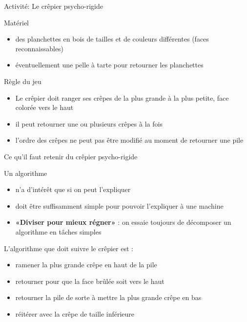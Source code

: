 \documentclass[final,hyperref={pdfpagelabels=false}]{beamer}
\renewenvironment{Coupe}{   }{   }
\begin{document}
\begin{Coupe}
\begin{frame}{Activité: Le crêpier psycho-rigide}
  \begin{block}{Matériel}
    \begin{itemize}
    \item des planchettes en bois de tailles et de couleurs différentes (faces reconnaissables)
    \item éventuellement une pelle à tarte pour retourner les planchettes
    \end{itemize}
  \end{block}

  \begin{block}{Règle du jeu}
    \begin{itemize}
    \item Le crêpier doit ranger ses crêpes de la plus grande à la plus petite,
      face colorée vers le haut
    \item il peut retourner une ou plusieurs crêpes à la fois
    \item l'ordre des crêpes ne peut pas être modifié au moment de retourner
      une pile
    \end{itemize}
  \end{block}

\end{frame}
\begin{frame}{Ce qu'il faut retenir du  crêpier psycho-rigide}

  \begin{block}{Un algorithme}
    \begin{itemize}
    \item n'a d'intérêt que si on peut l'expliquer
    \item doit être suffisamment simple pour pouvoir l'expliquer à une machine
    \item \alert{\textbf{«Diviser pour mieux régner»}} : on essaie
    toujours de décomposer un algorithme en tâches simples
    \end{itemize}
  \end{block}

  \begin{block}{L'algorithme que doit suivre le crêpier est :}
    \begin{itemize}
    \item ramener la plus grande crêpe en haut de la pile
    \item retourner pour que la face brûlée soit vers le haut
    \item retourner la pile de sorte à mettre la plus grande crêpe en bas
    \item réitérer avec la crêpe de taille inférieure
    \end{itemize}
  \end{block}


\end{frame}
\end{Coupe}
\end{document}
